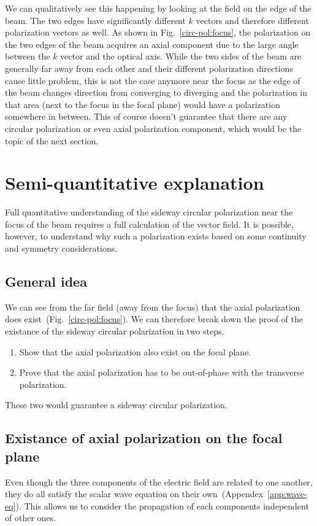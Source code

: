 \documentclass[10pt,fleqn]{article}
\begin{document}
We can qualitatively see this happening by looking at the field
on the edge of the beam.
The two edges have significantly different $k$ vectors
and therefore different polarization vectors as well.
As shown in Fig.~\ref{circ-pol:focus}, the polarization on the two edges of the beam
acquires an axial component due to the large angle between the $k$ vector
and the optical axis. While the two sides of the beam are generally
far away from each other and their different polarization directions cause
little problem, this is not the case anymore near the focus as the edge of the beam
changes direction from converging to diverging and the polarization in that area
(next to the focus in the focal plane) would have a polarization somewhere in between.
This of course doesn't guarantee that there are any circular polarization
or even axial polarization component, which would be the topic of the next section.

\section{Semi-quantitative explanation}

Full quantitative understanding of the sideway circular polarization
near the focus of the beam requires a full calculation of the vector field.
It is possible, however, to understand why such a polarization exists
based on some continuity and symmetry considerations.

\subsection{General idea}
We can see from the far field (away from the focus)
that the axial polarization does exist~(Fig.~\ref{circ-pol:focus}).
We can therefore break down the proof of the existance of
the sideway circular polarization in two steps.
\begin{enumerate}
\item Show that the axial polarization also exist on the focal plane.
\item Prove that the axial polarization has to be out-of-phase
  with the transverse polarization.
\end{enumerate}
These two would guarantee a sideway circular polarization.

\subsection{Existance of axial polarization on the focal plane}
Even though the three components of the electric field are related to one another,
they do all satisfy the scalar wave equation on their own~(Appendex~\ref{app:wave-eq}).
This allows us to consider the propagation of each components independent of other ones.
\end{document}
